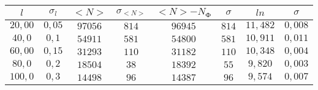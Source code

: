 \begin{tabular}{| c | c | c | c | c | c | c | c |}
\hline
$l$ & $\sigma_l$ & $<N>$ & $\sigma_{<N>}$ & $<N>-N_Ф$ & $\sigma$ & $ln$ & $\sigma$\\
\hline
$20,00$ & $0,05$ & $97056$ & $814$ & $96945$ & $814$ & $11,482$ & $0,008$\\
\hline
$40,0$ & $0,1$ & $54911$ & $581$ & $54800$ & $581$ & $10,911$ & $0,011$\\
\hline
$60,00$ & $0,15$ & $31293$ & $110$ & $31182$ & $110$ & $10,348$ & $0,004$\\
\hline
$80,0$ & $0,2$ & $18504$ & $38$ & $18392$ & $55$ & $9,820$ & $0,003$\\
\hline
$100,0$ & $0,3$ & $14498$ & $96$ & $14387$ & $96$ & $9,574$ & $0,007$\\
\hline
\end{tabular}
